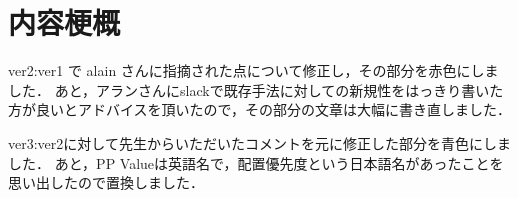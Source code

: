 \chapter*{内容梗概}
ver2:ver1 で alain さんに指摘された点について修正し，その部分を赤色にしました．
あと，アランさんにslackで既存手法に対しての新規性をはっきり書いた方が良いとアドバイスを頂いたので，その部分の文章は大幅に書き直しました．

ver3:ver2に対して先生からいただいたコメントを元に修正した部分を青色にしました．
あと，PP Valueは英語名で，配置優先度という日本語名があったことを思い出したので置換しました．


